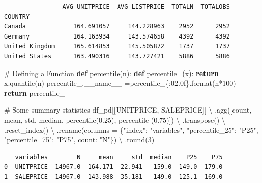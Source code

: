 \documentclass[
  letterpaper,
  DIV=11,
  numbers=noendperiod]{scrreprt}
\newenvironment{Shaded}{\begin{snugshade}}{\end{snugshade}}
\newcommand{\BuiltInTok}[1]{\textcolor[rgb]{0.00,0.23,0.31}{#1}}
\newcommand{\CommentTok}[1]{\textcolor[rgb]{0.37,0.37,0.37}{#1}}
\newcommand{\ControlFlowTok}[1]{\textcolor[rgb]{0.00,0.23,0.31}{\textbf{#1}}}
\newcommand{\DecValTok}[1]{\textcolor[rgb]{0.68,0.00,0.00}{#1}}
\newcommand{\FloatTok}[1]{\textcolor[rgb]{0.68,0.00,0.00}{#1}}
\newcommand{\KeywordTok}[1]{\textcolor[rgb]{0.00,0.23,0.31}{\textbf{#1}}}
\newcommand{\NormalTok}[1]{\textcolor[rgb]{0.00,0.23,0.31}{#1}}
\newcommand{\OperatorTok}[1]{\textcolor[rgb]{0.37,0.37,0.37}{#1}}
\newcommand{\SpecialCharTok}[1]{\textcolor[rgb]{0.37,0.37,0.37}{#1}}
\newcommand{\StringTok}[1]{\textcolor[rgb]{0.13,0.47,0.30}{#1}}
\newcommand{\VariableTok}[1]{\textcolor[rgb]{0.07,0.07,0.07}{#1}}
\begin{document}
\begin{verbatim}
                AVG_UNITPRICE  AVG_LISTPRICE  TOTALN  TOTALOBS
COUNTRY                                                       
Canada             164.691057     144.228963    2952      2952
Germany            164.163934     143.574658    4392      4392
United Kingdom     165.614853     145.505872    1737      1737
United States      163.490316     143.727421    5886      5886
\end{verbatim}

\begin{Shaded}
\begin{Highlighting}[]
\CommentTok{\# Defining a Function}
\KeywordTok{def}\NormalTok{ percentile(n):}
    \KeywordTok{def}\NormalTok{ percentile\_(x):}
        \ControlFlowTok{return}\NormalTok{ x.quantile(n)}
\NormalTok{    percentile\_.}\VariableTok{\_\_name\_\_} \OperatorTok{=}\StringTok{\textquotesingle{}percentile\_}\SpecialCharTok{\{:02.0f\}}\StringTok{\textquotesingle{}}\NormalTok{.}\BuiltInTok{format}\NormalTok{(n}\OperatorTok{*}\DecValTok{100}\NormalTok{)}
    \ControlFlowTok{return}\NormalTok{ percentile\_}

\CommentTok{\# Some summary statistics }
\NormalTok{df\_pd[[}\StringTok{\textquotesingle{}UNITPRICE\textquotesingle{}}\NormalTok{, }\StringTok{\textquotesingle{}SALEPRICE\textquotesingle{}}\NormalTok{]] }\OperatorTok{\textbackslash{}}
\NormalTok{    .agg([}\StringTok{\textquotesingle{}count\textquotesingle{}}\NormalTok{, }\StringTok{\textquotesingle{}mean\textquotesingle{}}\NormalTok{, }\StringTok{\textquotesingle{}std\textquotesingle{}}\NormalTok{, }\StringTok{\textquotesingle{}median\textquotesingle{}}\NormalTok{, percentile(}\FloatTok{0.25}\NormalTok{), percentile (}\FloatTok{0.75}\NormalTok{)]) }\OperatorTok{\textbackslash{}}
\NormalTok{    .transpose() }\OperatorTok{\textbackslash{}}
\NormalTok{    .reset\_index() }\OperatorTok{\textbackslash{}}
\NormalTok{    .rename(columns }\OperatorTok{=}\NormalTok{ \{}\StringTok{"index"}\NormalTok{: }\StringTok{"variables"}\NormalTok{, }\StringTok{"percentile\_25"}\NormalTok{: }\StringTok{"P25"}\NormalTok{, }\StringTok{"percentile\_75"}\NormalTok{: }\StringTok{"P75"}\NormalTok{, }\StringTok{\textquotesingle{}count\textquotesingle{}}\NormalTok{: }\StringTok{"N"}\NormalTok{\}) }\OperatorTok{\textbackslash{}}
\NormalTok{    .}\BuiltInTok{round}\NormalTok{(}\DecValTok{3}\NormalTok{) }
\end{Highlighting}
\end{Shaded}

\begin{verbatim}
   variables        N     mean     std  median    P25    P75
0  UNITPRICE  14967.0  164.171  22.941   159.0  149.0  179.0
1  SALEPRICE  14967.0  143.988  35.181   149.0  125.1  169.0
\end{verbatim}
\end{document}
